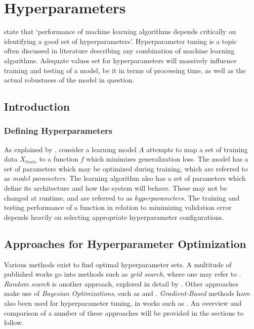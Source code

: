 \chapter[Hyperparameters]{Hyperparameters}
\label{ch:Hyperparameters}

\cite{Li2017} state that `performance of machine learning algorithms depends critically on identifying a good set of hyperparameters'. Hyperparameter tuning is a topic often discussed in literature describing any combination of machine learning algorithms. Adequate values set for hyperparameters will massively influence training and testing of a model, be it in terms of processing time, as well as the actual robustness of the model in question. 

\section{Introduction}\label{sec:introduction}
\subsection{Defining Hyperparameters}
\label{sec:defining-hyperparams}

As explained by \cite{Bergstra2012}, consider a learning model $A$ attempts to map a set of training data $X_{train}$ to a function $f$ which minimizes generalization loss. The model has a set of parameters which may be optimized during training, which are referred to as \textit{model parameters}. The learning algorithm also has a set of parameters which define its architecture and how the system will behave. These may not be changed at runtime, and are referred to as \textit{hyperparameters}. The training and testing performance of a function in relation to minimizing validation error depends heavily on selecting appropriate hyperparameter configurations.


\section{Approaches for Hyperparameter Optimization}
\label{sec:optimization-approaches}
Various methods exist to find optimal hyperparameter sets. A multitude of published works go into methods such as \textit{grid search}, where one may refer to \cite{Duan2005}. \textit{Random search} is another approach, explored in detail by \cite{Bergstra2012}. Other approaches make use of \textit{Bayesian Optimizations}, such as \cite{Snoek2012} and \cite{Snoek2015}. \textit{Gradient-Based} methods have also been used for hyperparameter tuning, in works such as \cite{SathiyaKeerthi2006}. An overview and comparison of a number of these approaches will be provided in the sections to follow.


